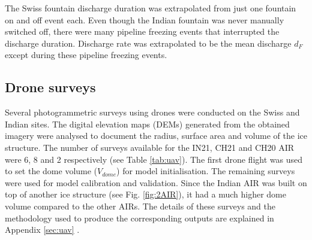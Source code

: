 \documentclass[utf8]{frontiersSCNS}
\begin{document}
The Swiss fountain discharge duration was extrapolated from just one fountain on and off event each. Even though
the Indian fountain was never manually switched off, there were many pipeline freezing events that interrupted
the discharge duration. Discharge rate was extrapolated to be the mean discharge $d_F$ except during these
pipeline freezing events.

\subsection{Drone surveys}

Several photogrammetric surveys using drones were conducted on the Swiss and Indian sites. The digital elevation
maps (DEMs) generated from the obtained imagery were analysed to document the radius, surface area and volume of
the ice structure. The number of surveys available for the IN21, CH21 and CH20 AIR were 6, 8 and 2 respectively
(see Table \ref{tab:uav}). The first drone flight was used to set the dome volume ($V_{dome}$) for model
initialisation. The remaining surveys were used for model calibration and validation. Since the Indian AIR was
built on top of another ice structure (see Fig. \ref{fig:2AIR}), it had a much higher dome volume compared to
the other AIRs.  The details of these surveys and the methodology used to produce the corresponding outputs are
explained in Appendix \ref{sec:uav} .
\end{document}
